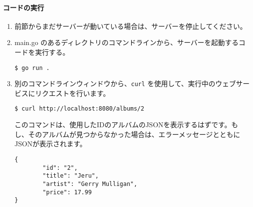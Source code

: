 \paragraph{コードの実行}

\begin{enumerate}
\item
  前節からまだサーバーが動いている場合は、サーバーを停止してください。
\item
  main.go
  のあるディレクトリのコマンドラインから、サーバーを起動するコードを実行する。

\begin{lstlisting}[numbers=none]
 $ go run .
\end{lstlisting}
\item
  別のコマンドラインウィンドウから、\texttt{curl}
  を使用して、実行中のウェブサービスにリクエストを行います。

\begin{lstlisting}[numbers=none]
$ curl http://localhost:8080/albums/2
\end{lstlisting}

  このコマンドは、使用したIDのアルバムのJSONを表示するはずです。もし、そのアルバムが見つからなかった場合は、エラーメッセージとともにJSONが表示されます。

\begin{lstlisting}[numbers=none]
{
        "id": "2",
        "title": "Jeru",
        "artist": "Gerry Mulligan",
        "price": 17.99
}
\end{lstlisting}
\end{enumerate}
